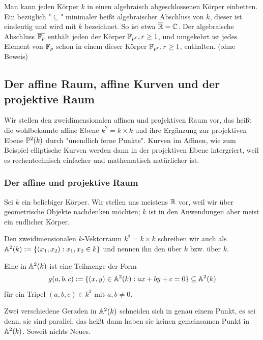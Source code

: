 \begin{bem}
\label{bem_7.22}
	Man kann jeden Körper $k$ in einen algebraisch abgeschlossenen Körper einbetten. 
	Ein bezüglich "$\subseteq$" minimaler heißt algebraischer Abschluss von $k$, dieser ist eindeutig und wird mit $\overline{k}$ bezeichnet. 
	So ist etwa $\overline{\mathbb{R}} = \mathbb{C}$. 
	Der algebraische Abschluss $\overline{\mathbb{F}_p}$ enthält jeden der Körper $\mathbb{F}_{p^r}, r \geq 1$, und umgekehrt ist jedes Element von $\overline{\mathbb{F}_p}$ schon in einem dieser Körper $\mathbb{F}_{p^r}, r \geq 1$, enthalten. 
	(ohne Beweis)
\end{bem}

\nextlecture
\newpage
\subsection{Der affine Raum, affine Kurven und der projektive Raum}
	Wir stellen den zweidimensionalen affinen und projektiven Raum vor,\marginnote{[8]} das heißt die wohlbekannte affine Ebene $k^2 = k \times k$ und ihre Ergänzung zur projektiven Ebene $\mathbb{P}^2(k)$ durch "unendlich ferne Punkte". 
	Kurven im Affinen, wie zum Beispiel elliptische Kurven werden dann in der projektiven Ebene intergriert, weil es rechentechnisch einfacher und mathematisch natürlicher ist.
	
\subsubsection{Der affine und projektive Raum}
	Sei $k$ ein beliebiger Körper. 
	Wir stellen uns meistens $\mathbb{R}$ vor, weil wir über geometrische Objekte nachdenken möchten; $k$ ist in den Anwendungen aber meist ein endlicher Körper.

\begin{defn}
	Den zweidimensionalen $k$-Vektorraum $k^2 = k \times k$ schreiben wir auch als $\mathbb{A}^2(k) := \{(x_1,x_2) : x_1,x_2 \in k\}$ und nennen ihn den  über $k$ bzw.  über $k$. 
\end{defn}

\begin{defn}[Gerade]
	Eine  in $\mathbb{A}^2(k)$ ist eine Teilmenge der Form
	\[ g(a,b,c) := \{(x,y) \in \mathbb{A}^2(k) : ax + by + c = 0\} \subseteq \mathbb{A}^2(k) \]
	für ein Tripel $(a,b,c) \in k^3$ mit $a,b \neq 0$.
\end{defn}

\begin{bem}
	Zwei verschiedene Geraden in $\mathbb{A}^2(k)$ schneiden sich in genau einem Punkt, es sei denn, sie sind parallel, das heißt dann haben sie keinen gemeinsamen Punkt in $\mathbb{A}^2(k)$. 
	Soweit nichts Neues.
\end{bem}

